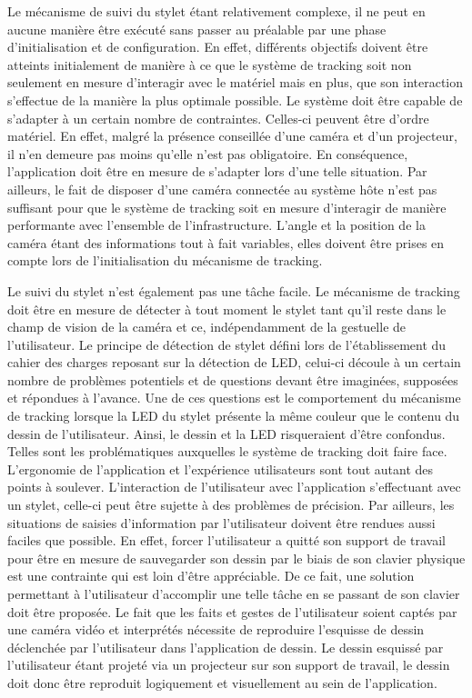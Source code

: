 \documentclass[11pt,a4paper,oldfontcommands]{memoir}
\begin{document}
Le mécanisme de suivi du stylet étant relativement complexe, il ne peut en aucune manière être exécuté sans passer au préalable par une phase d'initialisation et de configuration. En effet, différents objectifs doivent être atteints initialement de manière à ce que le système de tracking soit non seulement en mesure d'interagir avec le matériel mais en plus, que son interaction s'effectue de la manière la plus optimale possible. Le système doit être capable de s'adapter à un certain nombre de contraintes. Celles-ci peuvent être d'ordre matériel. En effet, malgré la présence conseillée d'une caméra et d'un projecteur, il n'en demeure pas moins qu'elle n'est pas obligatoire. En conséquence, l'application doit être en mesure de s'adapter lors d'une telle situation. Par ailleurs, le fait de disposer d'une caméra connectée au système hôte n'est pas suffisant pour que le système de tracking soit en mesure d'interagir de manière performante avec l'ensemble de l'infrastructure. L'angle et la position de la caméra étant des informations tout à fait variables, elles doivent être prises en compte lors de l'initialisation du mécanisme de tracking.

Le suivi du stylet n'est également pas une tâche facile. Le mécanisme de tracking doit être en mesure de détecter à tout moment le stylet tant qu'il reste dans le champ de vision de la caméra et ce, indépendamment de la gestuelle de l'utilisateur. Le principe de détection de stylet défini lors de l'établissement du cahier des charges reposant sur la détection de LED, celui-ci découle à un certain nombre de problèmes potentiels et de questions devant être imaginées, supposées et répondues à l'avance. Une de ces questions est le comportement du mécanisme de tracking lorsque la LED du stylet présente la même couleur que le contenu du dessin de l'utilisateur. Ainsi, le dessin et la LED risqueraient d'être confondus. Telles sont les problématiques auxquelles le système de tracking doit faire face. L'ergonomie de l'application et l'expérience utilisateurs sont tout autant des points à soulever. L'interaction de l'utilisateur avec l'application s'effectuant avec un stylet, celle-ci peut être sujette à des problèmes de précision. Par ailleurs, les situations de saisies d'information par l'utilisateur doivent être rendues aussi faciles que possible. En effet, forcer l'utilisateur a quitté son support de travail pour être en mesure de sauvegarder son dessin par le biais de son clavier physique est une contrainte qui est loin d'être appréciable. De ce fait, une solution permettant à l'utilisateur d'accomplir une telle tâche en se passant de son clavier doit être proposée. Le fait que les faits et gestes de l'utilisateur soient captés par une caméra vidéo et interprétés nécessite de reproduire l'esquisse de dessin déclenchée par l'utilisateur dans l'application de dessin. Le dessin esquissé par l'utilisateur étant projeté via un projecteur sur son support de travail, le dessin doit donc être reproduit logiquement et visuellement au sein de l'application.
\end{document}
